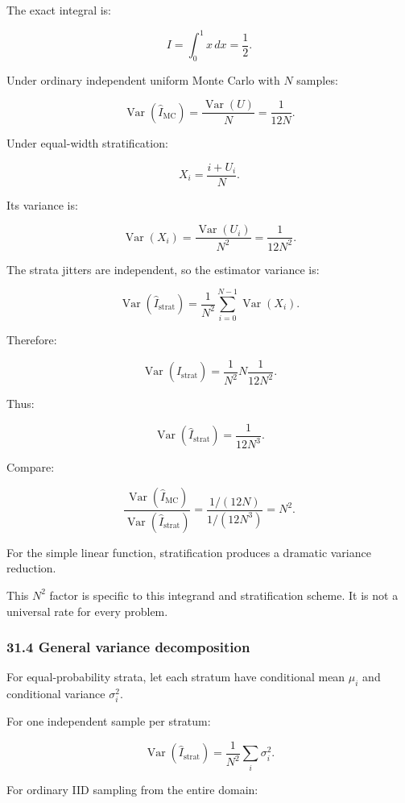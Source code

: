 The exact integral is:

\[ I=\int_0^1x\,dx=\frac12. \]

Under ordinary independent uniform Monte Carlo with \(N\) samples:

\[ \operatorname{Var}(\widehat I_{\mathrm{MC}}) = \frac{\operatorname{Var}(U)}N = \boxed{\frac1{12N}}. \]

Under equal-width stratification:

\[ X_i=\frac{i+U_i}{N}. \]

Its variance is:

\[ \operatorname{Var}(X_i) = \frac{\operatorname{Var}(U_i)}{N^2} = \frac1{12N^2}. \]

The strata jitters are independent, so the estimator variance is:

\[ \operatorname{Var}(\widehat I_{\mathrm{strat}}) = \frac1{N^2} \sum_{i=0}^{N-1}\operatorname{Var}(X_i). \]

Therefore:

\[ \operatorname{Var}(\widehat I_{\mathrm{strat}}) = \frac1{N^2} N\frac1{12N^2}. \]

Thus:

\[ \boxed{ \operatorname{Var}(\widehat I_{\mathrm{strat}}) = \frac1{12N^3} }. \]

Compare:

\[ \frac{ \operatorname{Var}(\widehat I_{\mathrm{MC}}) }{ \operatorname{Var}(\widehat I_{\mathrm{strat}}) } = \frac{1/(12N)}{1/(12N^3)} = \boxed{N^2}. \]

For the simple linear function, stratification produces a dramatic variance reduction.

This \(N^2\) factor is specific to this integrand and stratification scheme. It is not a universal rate for every problem.

\subsubsection{31.4 General variance decomposition}\label{general-variance-decomposition}

For equal-probability strata, let each stratum have conditional mean \(\mu_i\) and conditional variance \(\sigma_i^2\).

For one independent sample per stratum:

\[ \boxed{ \operatorname{Var}(\widehat I_{\mathrm{strat}}) = \frac1{N^2}\sum_i\sigma_i^2 }. \]

For ordinary IID sampling from the entire domain:

